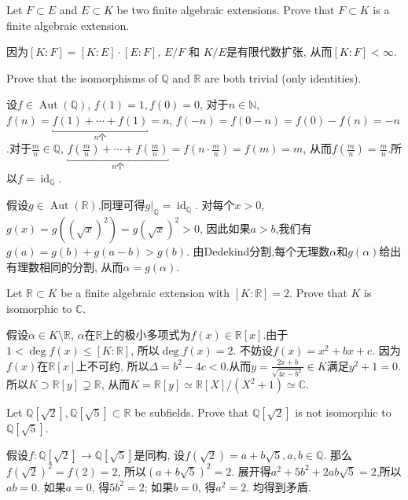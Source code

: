 \documentclass{exam-zh}
\newcommand{\NN}{{\mathbb{N}}}
\newcommand{\QQ}{{\mathbb{Q}}}
\newcommand{\RR}{{\mathbb{R}}}
\newcommand{\CC}{{\mathbb{C}}}
\newcommand{\isom}{\simeq}
\DeclareMathOperator{\aut}{Aut}
\DeclareMathOperator{\id}{id}
\begin{document}
\begin{question}
  Let $F\subset E$ and $E\subset K$ be two finite algebraic extensions. Prove that $F\subset K$ is a finite algebraic extension.
\end{question}
\begin{solution}
  因为$[K:F]=[K:E]\cdot [E:F]$, $E/F$ 和 $K/E$是有限代数扩张, 从而$[K:F]<\infty$.
\end{solution}
\begin{question}
  Prove that the isomorphisms of $\QQ$ and $\RR$ are both trivial (only identities).
\end{question}
\begin{solution}
  设$f\in\aut(\QQ)$, $f(1)=1, f(0)=0$, 对于$n\in\NN$, $f(n)=\underbracket{f(1)+\cdots +f(1)}_{n\text{个}}=n$, $f(-n)=f(0-n)=f(0)-f(n)=-n$.对于$\frac{m}{n}\in \QQ$, $\underbracket{f(\frac{m}{n})+\cdots+f(\frac{m}{n})}_{n\text{个}}=f(n\cdot \frac{m}{n})=f(m)=m$, 从而$f(\frac{m}{n})=\frac{m}{n}$.所以$f=\id_{\QQ}$.
  
  假设$g\in\aut(\RR)$,同理可得$g|_{\QQ}=\id_{\QQ}$. 对每个$x>0$, $g(x)=g((\sqrt{x})^2)=g(\sqrt{x})^2>0$, 因此如果$a>b$,我们有$g(a)=g(b)+g(a-b)>g(b)$. 由Dedekind分割,每个无理数$\alpha$和$g(\alpha)$给出有理数相同的分割, 从而$\alpha=g(\alpha)$.
\end{solution}
\begin{question}
  Let $\RR\subset K$ be a finite algebraic extension with $[K:\RR]=2$. Prove that $K$ is isomorphic to $\CC$.
\end{question}
\begin{solution}
  假设$\alpha\in K\setminus\RR$, $\alpha$在$\RR$上的极小多项式为$f(x)\in\RR[x]$.由于$1<\deg f(x)\leq [K:\RR]$, 所以$\deg f(x)=2$. 不妨设$f(x)=x^2+bx+c$. 因为$f(x)$在$\RR[x]$上不可约, 所以$\Delta=b^2-4c<0$.从而$y=\frac{2x+b}{\sqrt{4c-b^2}}\in K$满足$y^2+1=0$.所以$K\supset \RR[y]\supsetneq\RR$, 从而$K=\RR[y]\isom \RR[X]/(X^2+1)\isom\CC$.
\end{solution}
\begin{question}
  Let $\QQ[\sqrt{2}], \QQ[\sqrt{5}]\subset\RR$ be subfields. Prove that $\QQ[\sqrt{2}]$ is not isomorphic to $\QQ[\sqrt{5}]$.
\end{question}
\begin{solution}
  假设$f:\QQ[\sqrt{2}]\to\QQ[\sqrt{5}]$是同构, 设$f(\sqrt{2})=a+b\sqrt{5}, a,b\in \QQ$.  那么$f(\sqrt{2})^2=f(2)=2$, 所以$(a+b\sqrt{5})^2=2$. 展开得$a^2+5b^2+2ab\sqrt{5}=2$,所以$ab=0$. 如果$a=0$, 得$5b^2=2$; 如果$b=0$, 得$a^2=2$. 均得到矛盾.
\end{solution}
\end{document}
